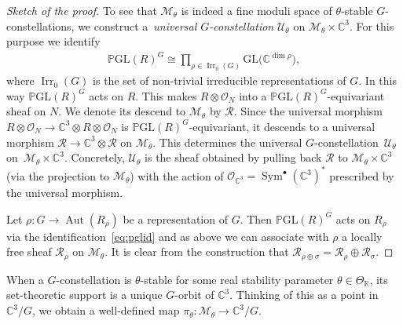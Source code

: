 \documentclass[pdftex]{sigma}
\numberwithin{equation}{section}
\newcommand{\sM}{\mathscr{M}}
\newcommand{\sO}{\mathscr{O}}
\newcommand{\sR}{\mathscr{R}}
\newcommand{\sU}{\mathscr{U}}
\newcommand{\R}{{\mathbb R}}
\newcommand{\C}{{\mathbb C}}
\newcommand{\GL}{\mathrm{GL}}
\newcommand{\PGL}{{\mathbb P}\GL}
\newcommand{\Irr}{\operatorname{Irr}}
\newcommand{\Aut}{\operatorname{Aut}}
\newcommand{\iso}{\cong}
\newcommand{\Sym}{\operatorname{Sym}}
\begin{document}
\begin{proof}[Sketch of the proof]
  To see that $\sM_{\theta}$ is indeed a f\/ine moduli space of
  $\theta$-stable $G$-constellations, we construct a~\emph{universal
    $G$-constellation} $\sU_\theta$ on $\sM_\theta\times \C^3$.  For
  this purpose we identify
  \begin{gather}\label{eq:pglid}
    \PGL(R)^G \iso \prod_{\rho \in \Irr_0(G)}\GL\big(\C^{\dim\rho}\big),
  \end{gather}
  where $\Irr_0(G)$ is the set of non-trivial irreducible
  representations of $G$.  In this way $\PGL(R)^G$ acts on $R$.  This
  makes $R\otimes\sO_N$ into a $\PGL(R)^G$-equivariant sheaf on $N$.
  We denote its descend to $\sM_\theta$ by $\sR$.  Since the universal
  morphism $R\otimes\sO_N \to \C^3\otimes R\otimes\sO_N$ is
  $\PGL(R)^G$-equivariant, it descends to a universal morphism $\sR
  \to \C^3\otimes \sR$ on $\sM_{\theta}$. This determines the
  universal $G$-constella\-tion~$\sU_{\theta}$ on~$\sM_\theta\times\C^3$.
  Concretely, $\sU_\theta$ is the sheaf obtained by pulling back $\sR$ to $\sM_\theta\times\C^3$ (via the projection to $\sM_\theta$) with the action of $\sO_{\C^3}=\Sym^\bullet(\C^3)^*$ prescribed by the universal morphism.

  Let $\rho\colon G \to \Aut(R_{\rho})$ be a representation of $G$.  Then
  $\PGL(R)^G$ acts on $R_\rho$ via the identif\/ication~\eqref{eq:pglid}
  and as above we can associate with $\rho$ a locally free sheaf
  $\sR_{\rho}$ on $\sM_\theta$.  It is clear from the construction
  that $\sR_{\rho\oplus\sigma}=\sR_\rho\oplus\sR_\sigma$.
\end{proof}

\begin{Remark}\label{rem:map}
  When a $G$-constellation is $\theta$-stable for some real
  stability parameter $\theta \in \Theta_\R$, its set-theoretic
  support is a unique $G$-orbit of $\C^3$. Thinking of this as a
  point in $\C^3/G$, we obtain a well-def\/ined map $\pi_{\theta}\colon
  \sM_{\theta} \to \C^3/G$.
\end{Remark}
\end{document}
